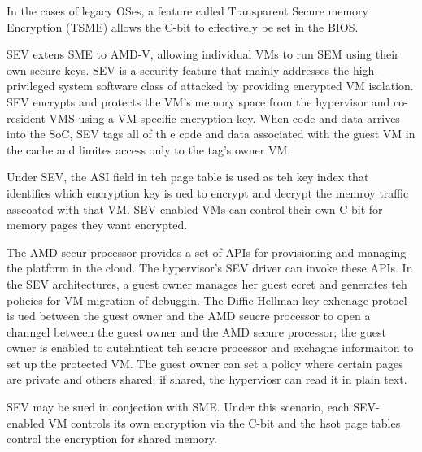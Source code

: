 In the cases of legacy OSes, a feature called Transparent Secure memory
Encryption (TSME) allows the C-bit to effectively be set in the BIOS.


SEV extens SME to AMD-V, allowing individual VMs to run SEM using their own
secure keys.
%
SEV is a security feature that mainly addresses the high-privileged system
software class of attacked by providing encrypted VM isolation.
%
SEV encrypts and protects the VM's memory space from the hypervisor and
co-resident VMS using a VM-specific encryption key.
%
When code and data arrives into the SoC, SEV tags all of th e code and data
associated with the guest VM in the cache and limites access only to the tag's
owner VM.

Under SEV, the ASI field in teh page table is used as teh key index that
identifies which encryption key is ued to encrypt and decrypt the memroy
traffic asscoated with that VM.
%
SEV-enabled VMs can control their own C-bit for memory pages they want
encrypted.


The AMD secur processor provides a set of APIs for provisioning and managing
the platform in the cloud.
%
The hypervisor's SEV driver can invoke these APIs.
%
In the SEV architectures, a guest owner manages her guest ecret and generates
teh policies for VM migration of debuggin.
%
The Diffie-Hellman key exhcnage protocl is ued between the guest owner and the
AMD seucre processor to open a channgel between the guest owner and the AMD
secure processor; the guest owner is enabled to autehnticat teh seucre
processor and exchagne informaiton to set up the protected VM.
%
The guest owner can set a policy where certain pages are private and others
shared; if shared, the hyperviosr can read it in plain text.

SEV may be sued in conjection with SME.  Under this scenario, each SEV-enabled
VM controls its own encryption via the C-bit and the hsot page tables control
the encryption for shared memory.
























